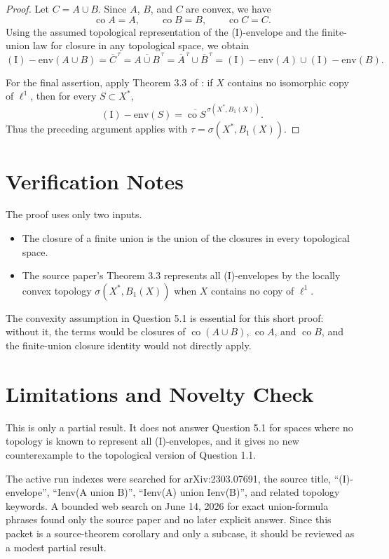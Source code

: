 \documentclass[11pt]{article}
\newcommand{\Ienv}{\operatorname{(I)-env}}
\newcommand{\co}{\operatorname{co}}
\begin{document}
\begin{proof}
Let $C=A\cup B$. Since $A$, $B$, and $C$ are convex, we have
\[
\co A=A,\qquad \co B=B,\qquad \co C=C.
\]
Using the assumed topological representation of the (I)-envelope and the
finite-union law for closure in any topological space, we obtain
\[
\Ienv(A\cup B)
=\overline{C}^{\,\tau}
=\overline{A\cup B}^{\,\tau}
=\overline A^{\,\tau}\cup \overline B^{\,\tau}
=\Ienv(A)\cup\Ienv(B).
\]

For the final assertion, apply Theorem 3.3 of \cite{KR}: if $X$ contains no
isomorphic copy of $\ell^1$, then for every $S\subset X^*$,
\[
\Ienv(S)=\overline{\co S}^{\,\sigma(X^*,B_1(X))}.
\]
Thus the preceding argument applies with
$\tau=\sigma(X^*,B_1(X))$.
\end{proof}

\section*{Verification Notes}

The proof uses only two inputs.

\begin{itemize}
\item The closure of a finite union is the union of the closures in every
topological space.
\item The source paper's Theorem 3.3 represents all (I)-envelopes by the
locally convex topology $\sigma(X^*,B_1(X))$ when $X$ contains no copy of
$\ell^1$.
\end{itemize}

The convexity assumption in Question 5.1 is essential for this short proof:
without it, the terms would be closures of $\co(A\cup B)$, $\co A$, and
$\co B$, and the finite-union closure identity would not directly apply.

\section*{Limitations and Novelty Check}

This is only a partial result. It does not answer Question 5.1 for spaces
where no topology is known to represent all (I)-envelopes, and it gives no new
counterexample to the topological version of Question 1.1.

The active run indexes were searched for arXiv:2303.07691, the source title,
``(I)-envelope'', ``Ienv(A union B)'', ``Ienv(A) union Ienv(B)'', and related
topology keywords. A bounded web search on June 14, 2026 for exact
union-formula phrases found only the source paper and no later explicit
answer. Since this packet is a source-theorem corollary and only a subcase,
it should be reviewed as a modest partial result.
\end{document}
